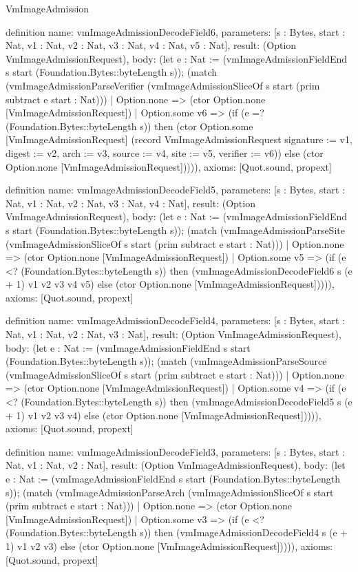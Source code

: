 \begin{lexlean}{VmImageAdmission}
\begin{semanticmodule}
definition{
  name: vmImageAdmissionDecodeField6,
  parameters: [s : Bytes, start : Nat, v1 : Nat, v2 : Nat, v3 : Nat, v4 : Nat, v5 : Nat],
  result: (Option VmImageAdmissionRequest),
  body: (let e : Nat := (vmImageAdmissionFieldEnd s start (Foundation.Bytes::byteLength s)); (match (vmImageAdmissionParseVerifier (vmImageAdmissionSliceOf s start (prim subtract e start : Nat)))
    | Option.none => (ctor Option.none [VmImageAdmissionRequest])
    | Option.some v6 => (if (e =? (Foundation.Bytes::byteLength s)) then (ctor Option.some [VmImageAdmissionRequest] (record VmImageAdmissionRequest {signature := v1, digest := v2, arch := v3, source := v4, site := v5, verifier := v6})) else (ctor Option.none [VmImageAdmissionRequest])))),
  axioms: [Quot.sound, propext]
}

definition{
  name: vmImageAdmissionDecodeField5,
  parameters: [s : Bytes, start : Nat, v1 : Nat, v2 : Nat, v3 : Nat, v4 : Nat],
  result: (Option VmImageAdmissionRequest),
  body: (let e : Nat := (vmImageAdmissionFieldEnd s start (Foundation.Bytes::byteLength s)); (match (vmImageAdmissionParseSite (vmImageAdmissionSliceOf s start (prim subtract e start : Nat)))
    | Option.none => (ctor Option.none [VmImageAdmissionRequest])
    | Option.some v5 => (if (e <? (Foundation.Bytes::byteLength s)) then (vmImageAdmissionDecodeField6 s (e + 1) v1 v2 v3 v4 v5) else (ctor Option.none [VmImageAdmissionRequest])))),
  axioms: [Quot.sound, propext]
}

definition{
  name: vmImageAdmissionDecodeField4,
  parameters: [s : Bytes, start : Nat, v1 : Nat, v2 : Nat, v3 : Nat],
  result: (Option VmImageAdmissionRequest),
  body: (let e : Nat := (vmImageAdmissionFieldEnd s start (Foundation.Bytes::byteLength s)); (match (vmImageAdmissionParseSource (vmImageAdmissionSliceOf s start (prim subtract e start : Nat)))
    | Option.none => (ctor Option.none [VmImageAdmissionRequest])
    | Option.some v4 => (if (e <? (Foundation.Bytes::byteLength s)) then (vmImageAdmissionDecodeField5 s (e + 1) v1 v2 v3 v4) else (ctor Option.none [VmImageAdmissionRequest])))),
  axioms: [Quot.sound, propext]
}

definition{
  name: vmImageAdmissionDecodeField3,
  parameters: [s : Bytes, start : Nat, v1 : Nat, v2 : Nat],
  result: (Option VmImageAdmissionRequest),
  body: (let e : Nat := (vmImageAdmissionFieldEnd s start (Foundation.Bytes::byteLength s)); (match (vmImageAdmissionParseArch (vmImageAdmissionSliceOf s start (prim subtract e start : Nat)))
    | Option.none => (ctor Option.none [VmImageAdmissionRequest])
    | Option.some v3 => (if (e <? (Foundation.Bytes::byteLength s)) then (vmImageAdmissionDecodeField4 s (e + 1) v1 v2 v3) else (ctor Option.none [VmImageAdmissionRequest])))),
  axioms: [Quot.sound, propext]
}


\end{semanticmodule}
\end{lexlean}
